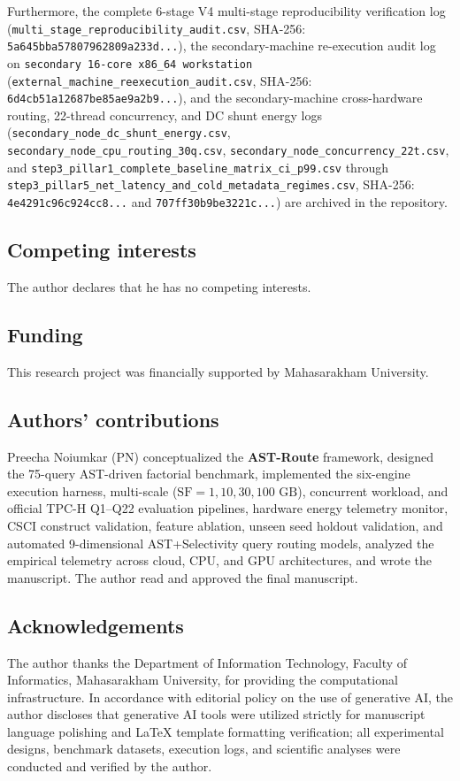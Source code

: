 \documentclass[10pt,a4paper]{article}
\begin{document}
Furthermore, the complete 6-stage V4 multi-stage reproducibility verification log (\texttt{multi\_stage\_reproducibility\_audit.csv}, SHA-256: \texttt{5a645bba57807962809a233d...}), the secondary-machine re-execution audit log on \texttt{secondary 16-core x86\_64 workstation} (\texttt{external\_machine\_reexecution\_audit.csv}, SHA-256: \texttt{6d4cb51a12687be85ae9a2b9...}), and the secondary-machine cross-hardware routing, 22-thread concurrency, and DC shunt energy logs (\texttt{secondary\_node\_\allowbreak dc\_shunt\_\allowbreak energy.csv}, \texttt{secondary\_node\_\allowbreak cpu\_routing\_30q.csv}, \texttt{secondary\_node\_\allowbreak concurrency\_22t.csv}, and \texttt{step3\_pillar1\_\allowbreak complete\_\allowbreak baseline\_\allowbreak matrix\_\allowbreak ci\_p99.csv} through \texttt{step3\_pillar5\_\allowbreak net\_\allowbreak latency\_\allowbreak and\_\allowbreak cold\_\allowbreak metadata\_\allowbreak regimes.csv}, SHA-256: \texttt{4e4291c96c924cc8...} and \texttt{707ff30b9be3221c...}) are archived in the repository.

\subsection*{Competing interests}
The author declares that he has no competing interests.

\subsection*{Funding}
This research project was financially supported by Mahasarakham University.

\subsection*{Authors' contributions}
Preecha Noiumkar (PN) conceptualized the \textbf{AST-Route} framework, designed the 75-query AST-driven factorial benchmark, implemented the six-engine execution harness, multi-scale ($\text{SF}=1, 10, 30, 100\text{ GB}$), concurrent workload, and official TPC-H Q1--Q22 evaluation pipelines, hardware energy telemetry monitor, CSCI construct validation, feature ablation, unseen seed holdout validation, and automated 9-dimensional AST+Selectivity query routing models, analyzed the empirical telemetry across cloud, CPU, and GPU architectures, and wrote the manuscript. The author read and approved the final manuscript.

\subsection*{Acknowledgements}
The author thanks the Department of Information Technology, Faculty of Informatics, Mahasarakham University, for providing the computational infrastructure. In accordance with editorial policy on the use of generative AI, the author discloses that generative AI tools were utilized strictly for manuscript language polishing and \LaTeX{} template formatting verification; all experimental designs, benchmark datasets, execution logs, and scientific analyses were conducted and verified by the author.
\end{document}
